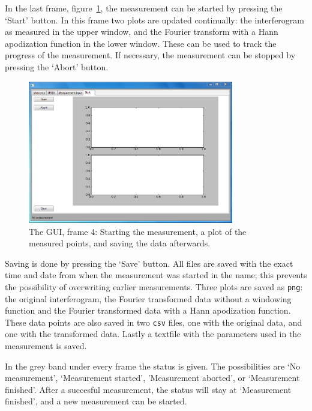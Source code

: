 In the last frame, figure~\ref{fig:gui4}, the measurement can be started by pressing the `Start' button. In this frame two plots are updated continually: the interferogram as measured in the upper window, and the Fourier transform with a Hann apodization function in the lower window. These can be used to track the progress of the measurement. If necessary, the measurement can be stopped by pressing the `Abort' button.

\begin{figure}[!ht]
 \begin{center}
  \includegraphics[width=0.8\textwidth]{figures/gui4}
  \caption{The GUI, frame 4: Starting the measurement, a plot of the measured points, and saving the data afterwards.}
  \label{fig:gui4}
 \end{center}
\end{figure}

Saving is done by pressing the `Save' button. All files are saved with the exact time and date from when the measurement was started in the name; this prevents the possibility of overwriting earlier measurements. Three plots are saved as \verb!png!: the original interferogram, the Fourier transformed data without a windowing function and the Fourier transformed data with a Hann apodization function. These data points are also saved in two \verb!csv! files, one with the original data, and one with the transformed data. Lastly a textfile with the parameters used in the measurement is saved.

In the grey band under every frame the status is given. The possibilities are `No measurement', `Measurement started', 'Measurement aborted', or `Measurement finished'. After a succesful measurement, the status will stay at `Measurement finished', and a new measurement can be started.